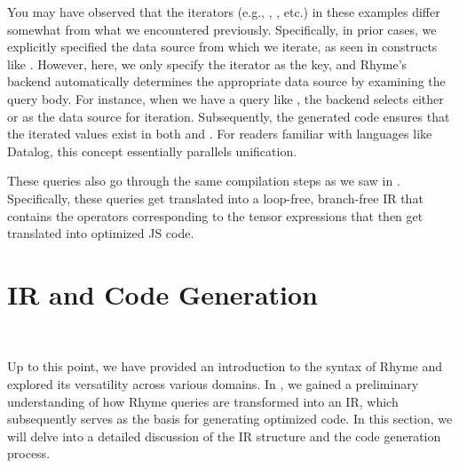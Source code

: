 \documentclass[runningheads]{llncs}
\newcommand{\lang}{Rhyme}
\begin{document}
You may have observed that the iterators (e.g., \inline{*}, , etc.) in these
examples differ somewhat from what we encountered previously.
Specifically, in prior cases, we explicitly specified the data source from which we iterate,
as seen in constructs like .
However, here, we only specify the iterator as the key, and \lang{}'s backend
automatically determines the appropriate data source by examining the query body.
For instance, when we have a query like , the
backend selects either  or  as the data source for iteration.
Subsequently, the generated code ensures that the iterated values exist in
both  and .
For readers familiar with languages like Datalog, this concept essentially
parallels unification.



These queries also go through the same compilation steps as we saw in .
Specifically, these queries get translated into a loop-free, branch-free IR that contains the
operators corresponding to the tensor expressions that then get translated into
optimized JS code.


\section{IR and Code Generation}~\label{sec:ir_codegen}

Up to this point, we have provided an introduction to the syntax of
\lang{} and explored its versatility across various domains.
In , we gained a preliminary understanding
of how \lang{} queries are transformed into an IR, which subsequently serves
as the basis for generating optimized code.
In this section, we will delve into a detailed discussion of the IR structure
and the code generation process.
\end{document}
